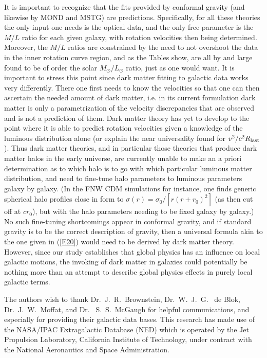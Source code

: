 \documentclass[preprint,aps]{revtex4}
\begin{document}
It is important to recognize that the fits provided by conformal gravity (and likewise by MOND and MSTG) are predictions. Specifically, for all these theories the only input one needs is the optical data, and the only free parameter is the $M/L$ ratio for each given galaxy, with rotation velocities then being determined. Moreover, the $M/L$  ratios are constrained by the need to not overshoot the data in the inner rotation curve region, and as the Tables show, are all by and large found to be of order the solar $M_{\odot}/L_{\odot}$ ratio, just as one would want. It is important to stress this point since dark matter fitting to galactic data works very differently. There one first needs to know the velocities so that one can then ascertain the needed amount of dark matter, i.e. in its current formulation dark matter is only a parametrization of the velocity discrepancies that are observed and is not a prediction of them. Dark matter theory has yet to develop to the point where it is able to predict rotation velocities given a knowledge of the luminous distribution alone (or explain the near universality found for $v^2/c^2R_{\rm last}$). Thus dark matter theories, and in particular those theories that produce dark matter halos in the early universe, are currently unable to make an a priori determination as to which halo is to go with which particular luminous matter distribution, and need to fine-tune halo parameters to luminous parameters galaxy by galaxy. (In the FNW CDM simulations \cite{Navarro1996} for instance, one finds generic spherical halo profiles close in form to $\sigma(r)=\sigma_0/[r(r+r_0)^2]$ (as then cut off at $cr_0$), but with the halo parameters needing to be fixed galaxy by galaxy.) No such fine-tuning shortcomings appear in conformal gravity, and if standard gravity is to be the correct  description of gravity, then a universal formula akin to the one given in (\ref{E20}) would need to be derived by dark matter theory. However, since our study establishes that global physics has an influence on local galactic motions, the invoking of dark matter in galaxies could potentially be nothing more than an attempt to describe global physics effects in purely local galactic terms.









The authors wish to thank Dr.~J.~R.~Brownstein, Dr.~W.~J.~G.~ de Blok, Dr.~J.~W.~Moffat, and Dr.~ S.~S.~McGaugh for helpful communications, and especially for providing their galactic data bases. This research has made use of the NASA/IPAC Extragalactic Database (NED) which is operated by the Jet Propulsion Laboratory, California Institute of Technology, under contract with the National Aeronautics and Space Administration. 
\end{document}
